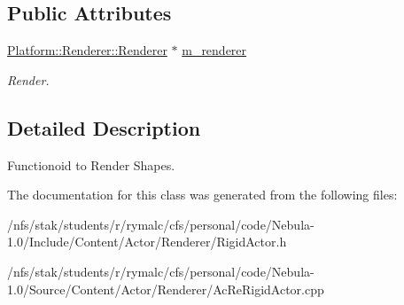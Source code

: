 \subsection*{Public Attributes}
\begin{DoxyCompactItemize}
\item 
\hypertarget{classContent_1_1Actor_1_1Renderer_1_1RigidActor_1_1Funct__Shape__Render_a229927bd9797dd97fe3fdc97fbcdf917}{
\hyperlink{classPlatform_1_1Renderer_1_1Renderer}{Platform::Renderer::Renderer} $\ast$ \hyperlink{classContent_1_1Actor_1_1Renderer_1_1RigidActor_1_1Funct__Shape__Render_a229927bd9797dd97fe3fdc97fbcdf917}{m\_\-renderer}}
\label{classContent_1_1Actor_1_1Renderer_1_1RigidActor_1_1Funct__Shape__Render_a229927bd9797dd97fe3fdc97fbcdf917}

\begin{DoxyCompactList}\small\item\em Render. \item\end{DoxyCompactList}\end{DoxyCompactItemize}


\subsection{Detailed Description}
Functionoid to Render Shapes. 

The documentation for this class was generated from the following files:\begin{DoxyCompactItemize}
\item 
/nfs/stak/students/r/rymalc/cfs/personal/code/Nebula-\/1.0/Include/Content/Actor/Renderer/RigidActor.h\item 
/nfs/stak/students/r/rymalc/cfs/personal/code/Nebula-\/1.0/Source/Content/Actor/Renderer/AcReRigidActor.cpp\end{DoxyCompactItemize}
